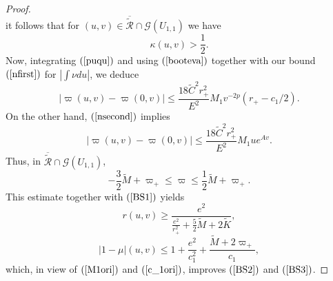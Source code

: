 \documentclass{article}
\begin{document}
{\begin{proof}
\[\]
it follows that for 
$(u,v)\in\overline{\tilde{\mathcal{R}}}\cap\mathcal{G}(U_{1,1})$ we have
\begin{equation}
\label{nowhave}
\kappa(u,v)>\frac12.
\end{equation}
Now, integrating $(\ref{puqu})$ and using $(\ref{booteva})$
together with our bound $(\ref{nfirst})$
for $\left|\int{\nu du}\right|$, we deduce
\begin{equation}
\label{topi}
|\varpi(u,v)-\varpi(0,v)|\le \frac{18\tilde{C}^2r_+^2}{E^2}M_1v^{-2p}
(r_+-c_1/2).
\end{equation}
On the other hand, $(\ref{nsecond})$ implies
\[
|\varpi(u,v)-\varpi(0,v)|\le \frac{18\tilde{C}^2r_+^2}{E^2}M_1ue^{Av}.
\]
Thus, in 
$\overline{\tilde{\mathcal{R}}}\cap\mathcal{G}(U_{1,1})$,
\begin{equation}
\label{palabo}
-\frac32\tilde{M}+\varpi_+\le\varpi\le\frac12\tilde{M}+\varpi_+. 
\end{equation}
This estimate
together with $(\ref{BS1})$ yields
\begin{equation}
\label{beraber}
r(u,v)\ge\frac{e^2}{\frac{e^2}{r_+^2}+\frac52\tilde{M}+2\tilde{K}},
\end{equation}
\begin{equation}
\label{asteraki}
|1-\mu|(u,v)\le1+\frac{e^2}{c_1^2}+\frac{\tilde{M}+2\varpi_+}{c_1},
\end{equation}
which, in view of
$(\ref{M1ori})$ and $(\ref{c_1ori})$, improves $(\ref{BS2})$ and $(\ref{BS3})$.


\end{proof}}
\end{document}
